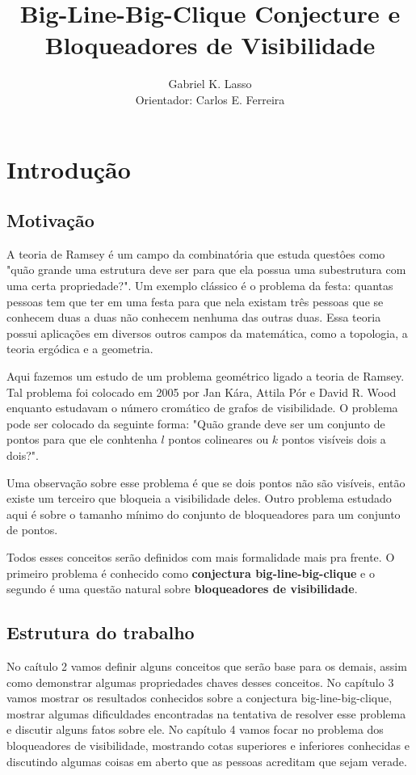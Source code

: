 \documentclass[a4paper]{book}
\title{\textbf{Big-Line-Big-Clique Conjecture e Bloqueadores de Visibilidade}}
\author{Gabriel K. Lasso\\ Orientador: Carlos E. Ferreira}
\date{}
\begin{document}
\maketitle
\tableofcontents
\chapter{Introdução}

\section{Motivação}
A teoria de Ramsey é um campo da combinatória que estuda questôes como "quão grande uma estrutura deve ser para que ela possua uma subestrutura com uma certa propriedade?". Um exemplo clássico é o problema da festa: quantas pessoas tem que ter em uma festa para que nela existam três pessoas que se conhecem duas a duas não conhecem nenhuma das outras duas. Essa teoria possui aplicações em diversos outros campos da matemática, como a topologia, a teoria ergódica e a geometria.\cite{ES}

Aqui fazemos um estudo de um problema geométrico ligado a teoria de Ramsey. Tal problema foi colocado em 2005 por Jan Kára, Attila Pór e David R. Wood enquanto estudavam o número cromático de grafos de visibilidade. O problema pode ser colocado da seguinte forma: "Quão grande deve ser um conjunto de pontos para que ele conhtenha $l$ pontos colineares ou $k$ pontos visíveis dois a dois?".

Uma observação sobre esse problema é que se dois pontos não são visíveis, então existe um terceiro que bloqueia a visibilidade deles. Outro problema estudado aqui é sobre o tamanho mínimo do conjunto de bloqueadores para um conjunto de pontos.

Todos esses conceitos serão definidos com mais formalidade mais pra frente. O primeiro problema é conhecido como \textbf{conjectura big-line-big-clique} e o segundo é uma questão natural sobre \textbf{bloqueadores de visibilidade}.

\section{Estrutura do trabalho}
No caítulo 2 vamos definir alguns conceitos que serão base para os demais, assim como demonstrar algumas propriedades chaves desses conceitos. No capítulo 3 vamos mostrar os resultados conhecidos sobre a conjectura big-line-big-clique, mostrar algumas dificuldades encontradas na tentativa de resolver esse problema e discutir alguns fatos sobre ele. No capítulo 4 vamos focar no problema dos bloqueadores de visibilidade, mostrando cotas superiores e inferiores conhecidas e discutindo algumas coisas em aberto que as pessoas acreditam que sejam verade.
\end{document}
